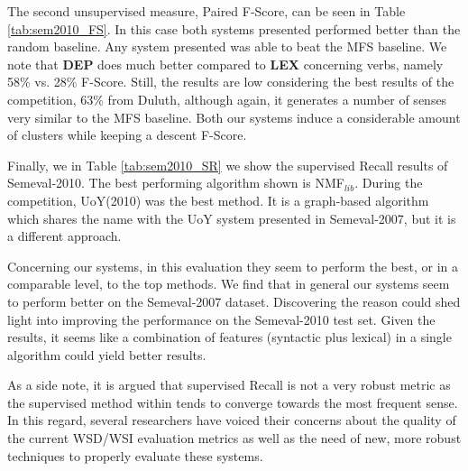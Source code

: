 The second unsupervised measure, Paired F-Score, can be seen in Table \ref{tab:sem2010_FS}. In this case both systems presented performed better than the random baseline. Any system presented was able to beat the MFS baseline. We note that \textbf{DEP} does much better compared to \textbf{LEX} concerning verbs, namely 58\% vs. 28\% F-Score. Still, the results are low considering the best results of the competition, 63\% from Duluth, although again, it generates a number of senses very similar to the MFS baseline. Both our systems induce a considerable amount of clusters while keeping a descent F-Score.

Finally, we in Table \ref{tab:sem2010_SR} we show the supervised Recall results of Semeval-2010. The best performing algorithm shown is NMF$_{lib}$. During the competition, UoY(2010) was the best method. It is a graph-based algorithm which shares the name with the UoY  system presented in Semeval-2007, but it is a different  approach. 

Concerning our systems, in this evaluation they seem to perform the best, or in a comparable level, to the top methods.  We find that in general our systems seem to perform better on the Semeval-2007 dataset. Discovering the reason could shed light into improving the performance on the Semeval-2010 test set. Given the results, it seems like a combination of features (syntactic plus lexical) in  a single algorithm could yield better results. 

As a side note, it is argued that supervised Recall is not a very robust metric as the supervised method within tends to converge towards the most frequent sense. In this regard, several researchers \cite{VandeCruys2011,pedersen2010duluth} have voiced their concerns about the quality of the current WSD/WSI evaluation metrics as well as the need of new, more robust techniques to properly evaluate these systems.



 
